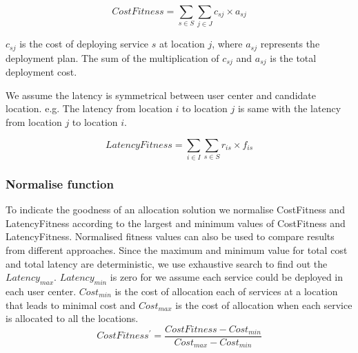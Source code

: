 \documentclass{llncs}
\begin{document}
\begin{equation}
	CostFitness = \sum\limits_{s \in S} \sum\limits_{j \in J} c_{sj} \times a_{sj}
\end{equation}

\begin{flushleft}$c_{sj}$ is the cost of deploying service $s$ at location $j$, where $a_{sj}$ represents the deployment plan. The sum of the multiplication of 
$c_{sj}$ and $a_{sj}$ is the total deployment cost.\end{flushleft}



We assume the latency is symmetrical between user center and candidate location. e.g. 
The latency from location $i$ to location $j$ is same with the latency from location $j$ to location $i$.

	\begin{equation}
		LatencyFitness = \sum\limits_{i \in I} \sum\limits_{s \in S} r_{is} \times f_{is}
	\end{equation}

\subsubsection{Normalise function}
To indicate the goodness of an allocation solution we normalise CostFitness and LatencyFitness according to the largest and minimum values of
CostFitness and LatencyFitness. Normalised fitness values can also be used to compare results from different approaches.
Since the maximum and minimum value for total cost and total latency are deterministic, we use exhaustive search to
find out the $Latency_{max}$. $Latency_{min}$ is zero for we assume each service could be deployed in each user center. 
$Cost_{min}$ is the cost of allocation each of services at a location that leads to minimal cost and $Cost_{max}$ is the cost of allocation when each service is allocated to all the 
locations.
	\begin{equation}
		CostFitness^\prime = \frac{CostFitness - Cost_{min}}{Cost_{max} - Cost_{min}}
	\end{equation}
\end{document}
